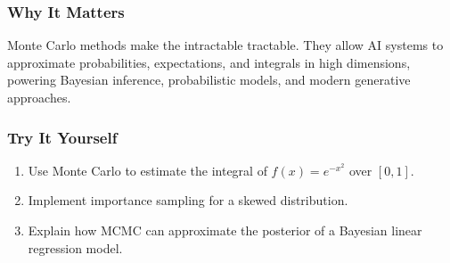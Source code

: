 \documentclass[
  letterpaper,
  DIV=11,
  numbers=noendperiod]{scrreprt}
\providecommand{\tightlist}{%
  \setlength{\itemsep}{0pt}\setlength{\parskip}{0pt}}
\begin{document}
\subsubsection{Why It Matters}\label{why-it-matters-97}

Monte Carlo methods make the intractable tractable. They allow AI
systems to approximate probabilities, expectations, and integrals in
high dimensions, powering Bayesian inference, probabilistic models, and
modern generative approaches.

\subsubsection{Try It Yourself}\label{try-it-yourself-199}

\begin{enumerate}
\def\labelenumi{\arabic{enumi}.}
\tightlist
\item
  Use Monte Carlo to estimate the integral of \(f(x)=e^{-x^2}\) over
  \([0,1]\).
\item
  Implement importance sampling for a skewed distribution.
\item
  Explain how MCMC can approximate the posterior of a Bayesian linear
  regression model.
\end{enumerate}
\end{document}
